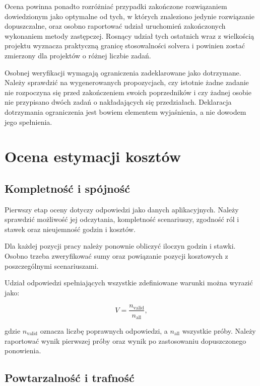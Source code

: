 Ocena powinna ponadto rozróżniać przypadki zakończone rozwiązaniem dowiedzionym jako optymalne od tych, w których znaleziono jedynie rozwiązanie dopuszczalne, oraz osobno raportować udział uruchomień zakończonych wykonaniem metody zastępczej. Rosnący udział tych ostatnich wraz z wielkością projektu wyznacza praktyczną granicę stosowalności solvera i powinien zostać zmierzony dla projektów o różnej liczbie zadań.

Osobnej weryfikacji wymagają ograniczenia zadeklarowane jako dotrzymane. Należy sprawdzić na wygenerowanych propozycjach, czy istotnie żadne zadanie nie rozpoczyna się przed zakończeniem swoich poprzedników i czy żadnej osobie nie przypisano dwóch zadań o nakładających się przedziałach. Deklaracja dotrzymania ograniczenia jest bowiem elementem wyjaśnienia, a nie dowodem jego spełnienia.

\section{Ocena estymacji kosztów}

\subsection{Kompletność i spójność}

Pierwszy etap oceny dotyczy odpowiedzi jako danych aplikacyjnych. Należy sprawdzić możliwość jej odczytania, kompletność scenariuszy, zgodność ról i stawek oraz nieujemność godzin i kosztów.

Dla każdej pozycji pracy należy ponownie obliczyć iloczyn godzin i stawki. Osobno trzeba zweryfikować sumy oraz powiązanie pozycji kosztowych z poszczególnymi scenariuszami.

Udział odpowiedzi spełniających wszystkie zdefiniowane warunki można wyrazić jako:

\begin{equation}
    V =
    \frac{n_{\mathrm{valid}}}{n_{\mathrm{all}}},
    \label{eq:testy-poprawnosc-estymacji}
\end{equation}

gdzie \(n_{\mathrm{valid}}\) oznacza liczbę poprawnych odpowiedzi, a \(n_{\mathrm{all}}\) wszystkie próby. Należy raportować wynik pierwszej próby oraz wynik po zastosowaniu dopuszczonego ponowienia.

\subsection{Powtarzalność i trafność}

